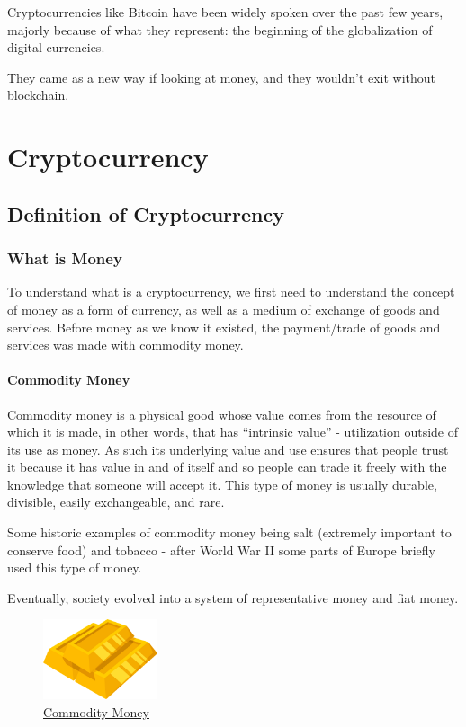 \documentclass{article}
\newcommand\tab[1][1cm]{\hspace*{#1}}
\begin{document}
\tab Cryptocurrencies like Bitcoin have been widely spoken over the past few years, majorly because of what they represent: the beginning of the globalization of digital currencies.

They came as a new way if looking at money, and they wouldn't exit without blockchain.

\section{Cryptocurrency}

\subsection{Definition of Cryptocurrency}

\subsubsection{What is Money}

\tab To understand what is a cryptocurrency, we first need to understand the concept of money as a form of currency, as well as a medium of exchange of goods and services. Before money as we know it existed, the payment/trade of goods and services was made with commodity money.

\paragraph{Commodity Money}
 
\tab Commodity money is a physical good whose value comes from the resource of which it is made, in other words, that has “intrinsic value” - utilization outside of its use as money. As such its underlying value and use ensures that people trust it because it has value in and of itself and so people can trade it freely with the knowledge that someone will accept it. This type of money is usually durable, divisible, easily exchangeable, and rare.

Some historic examples of commodity money being salt (extremely important to conserve food) and tobacco - after World War II some parts of Europe briefly used this type of money.

Eventually, society evolved into a system of representative money and fiat money.

\begin{figure}[H]
    \begin{center}
        \includegraphics[width=0.3\textwidth]{images/gold.png}
        \caption{\href{https://creazilla-store.fra1.digitaloceanspaces.com/cliparts/60810/gold-bars-clipart-md.png}{\underline{Commodity Money}}}
    \end{center}
\end{figure}
\end{document}
